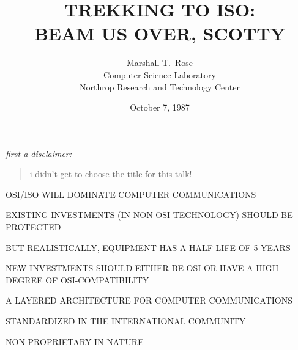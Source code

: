 

\raggedright





\title	{TREKKING TO ISO:\\ BEAM US OVER, SCOTTY}
\author	{Marshall T.~Rose\\
	Computer Science Laboratory\\
	Northrop Research and Technology Center}
\date	{October 7, 1987}
\maketitlepage


\begin{note}\em
first a disclaimer:

\begin{quote}
i didn't get to choose the title for this talk!
\end{quote}
\end{note}


\begin{bwslide}

\begin{nrtc}
\item	OSI/ISO WILL DOMINATE COMPUTER COMMUNICATIONS

\item	EXISTING INVESTMENTS (IN NON-OSI TECHNOLOGY) SHOULD BE PROTECTED
    \begin{nrtc}
    \item	BUT REALISTICALLY, EQUIPMENT HAS A HALF-LIFE OF 5 YEARS
    \end{nrtc}

\item	NEW INVESTMENTS SHOULD EITHER BE OSI OR HAVE A HIGH DEGREE OF
	OSI-COMPATIBILITY
\end{nrtc}
\end{bwslide}


\begin{bwslide}

\begin{nrtc}
\item	A LAYERED ARCHITECTURE FOR COMPUTER COMMUNICATIONS

\item	STANDARDIZED IN THE INTERNATIONAL COMMUNITY

\item	NON-PROPRIETARY IN NATURE
\end{nrtc}
\end{bwslide}


